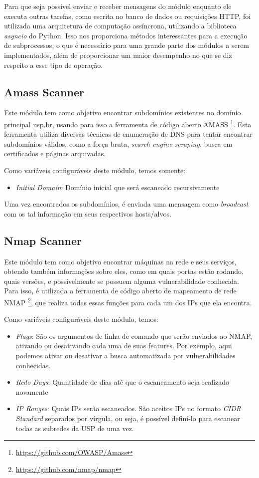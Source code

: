     Para que seja possível enviar e receber mensagens do módulo enquanto ele executa outras tarefas, como escrita no banco de dados ou requisições HTTP, foi utilizada uma arquitetura de computação assíncrona, utilizando a biblioteca \textit{asyncio} do Python. Isso nos proporciona métodos interessantes para a execução de subprocessos, o que é necessário para uma grande parte dos módulos a serem implementados, além de proporcionar um maior desempenho no que se diz respeito a esse tipo de operação. 

    \subsection{Amass Scanner}
    
    Este módulo tem como objetivo encontrar subdomínios existentes no domínio principal \url{usp.br}, usando para isso a ferramenta de código aberto AMASS \footnote{\url{https://github.com/OWASP/Amass}}. Esta ferramenta utiliza diversas técnicas de enumeração de DNS para tentar encontrar subdomínios válidos, como a força bruta, \textit{search engine scraping}, busca em certificados e páginas arquivadas.
    
    Como variáveis configuráveis deste módulo, temos somente:
    \begin{itemize}
    \item \emph{Initial Domain}: Domínio inicial que será escaneado recursivamente
    \end{itemize}
    
    Uma vez encontrados os subdomínios, é enviada uma mensagem como \textit{broadcast} com os tal informação em seus respectivos hosts/alvos.
    \subsection{Nmap Scanner}
    Este módulo tem como objetivo encontrar máquinas na rede e seus serviços, obtendo também informações sobre eles, como em quais portas estão rodando, quais versões, e possivelmente se possuem alguma vulnerabilidade conhecida. Para isso, é utilizada a ferramenta de código aberto de mapeamento de rede NMAP \footnote{\url{https://github.com/nmap/nmap}}, que realiza todas essas funções para cada um dos IPs que ela encontra.
    
    Como variáveis configuráveis deste módulo, temos:
    \begin{itemize}
        \item \emph{Flags}: São os argumentos de linha de comando que serão enviados ao NMAP, ativando ou desativando cada uma de suas features. Por exemplo, aqui podemos ativar ou desativar a busca automatizada por vulnerabilidades conhecidas.
        \item \emph{Redo Days}: Quantidade de dias até que o escaneamento seja realizado novamente
        \item \emph{IP Ranges}: Quais IPs serão escaneados. São aceitos IPs no formato \textit{CIDR Standard} separados por vírgula, ou seja, é possível definí-lo para escanear todas as subredes da USP de uma vez.
    \end{itemize}
    
